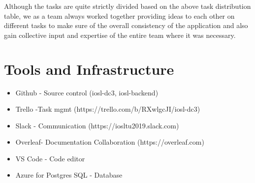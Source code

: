 Although the tasks are quite strictly divided based on the above task distribution table, we as a team always worked together providing ideas to each other on different tasks to make sure of the overall consistency of the application and also gain collective input and expertise of the entire team where it was necessary.
\section{Tools and Infrastructure}

\begin{itemize}
\item Github - Source control (iosl-dc3, iosl-backend)
\item Trello -Task mgmt (https://trello.com/b/RXwlgcJI/iosl-dc3)
\item Slack - Communication (https://iosltu2019.slack.com)
\item Overleaf- Documentation Collaboration (https://overleaf.com)
\item VS Code - Code editor
\item Azure for Postgres SQL - Database
\end{itemize}
